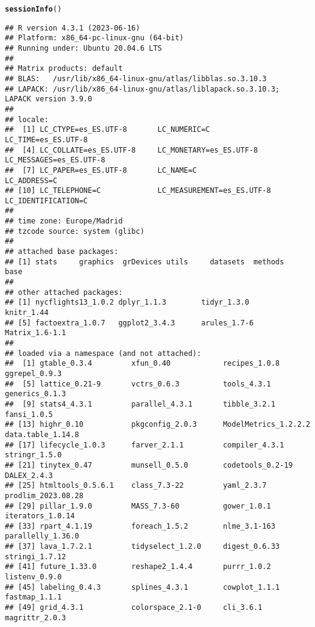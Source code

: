 \documentclass{article}\usepackage[]{graphicx}\usepackage[]{xcolor}
\makeatletter
\newcommand{\hlstd}[1]{\textcolor[rgb]{0.345,0.345,0.345}{#1}}%
\newcommand{\hlkwd}[1]{\textcolor[rgb]{0.737,0.353,0.396}{\textbf{#1}}}%
\newenvironment{kframe}{%
 \def\at@end@of@kframe{}%
 \ifinner\ifhmode%
  \def\at@end@of@kframe{\end{minipage}}%
  \begin{minipage}{\columnwidth}%
 \fi\fi%
 \def\FrameCommand##1{\hskip\@totalleftmargin \hskip-\fboxsep
 \colorbox{shadecolor}{##1}\hskip-\fboxsep
     \hskip-\linewidth \hskip-\@totalleftmargin \hskip\columnwidth}%
 \MakeFramed {\advance\hsize-\width
   \@totalleftmargin\z@ \linewidth\hsize
   \@setminipage}}%
 {\par\unskip\endMakeFramed%
 \at@end@of@kframe}
\newenvironment{knitrout}{}{} %
\makeatother
\begin{document}
\begin{knitrout}
\color{fgcolor}\begin{kframe}
\begin{alltt}
\hlkwd{sessionInfo}\hlstd{()}
\end{alltt}
\begin{verbatim}
## R version 4.3.1 (2023-06-16)
## Platform: x86_64-pc-linux-gnu (64-bit)
## Running under: Ubuntu 20.04.6 LTS
## 
## Matrix products: default
## BLAS:   /usr/lib/x86_64-linux-gnu/atlas/libblas.so.3.10.3 
## LAPACK: /usr/lib/x86_64-linux-gnu/atlas/liblapack.so.3.10.3;  LAPACK version 3.9.0
## 
## locale:
##  [1] LC_CTYPE=es_ES.UTF-8       LC_NUMERIC=C               LC_TIME=es_ES.UTF-8       
##  [4] LC_COLLATE=es_ES.UTF-8     LC_MONETARY=es_ES.UTF-8    LC_MESSAGES=es_ES.UTF-8   
##  [7] LC_PAPER=es_ES.UTF-8       LC_NAME=C                  LC_ADDRESS=C              
## [10] LC_TELEPHONE=C             LC_MEASUREMENT=es_ES.UTF-8 LC_IDENTIFICATION=C       
## 
## time zone: Europe/Madrid
## tzcode source: system (glibc)
## 
## attached base packages:
## [1] stats     graphics  grDevices utils     datasets  methods   base     
## 
## other attached packages:
## [1] nycflights13_1.0.2 dplyr_1.1.3        tidyr_1.3.0        knitr_1.44        
## [5] factoextra_1.0.7   ggplot2_3.4.3      arules_1.7-6       Matrix_1.6-1.1    
## 
## loaded via a namespace (and not attached):
##  [1] gtable_0.3.4         xfun_0.40            recipes_1.0.8        ggrepel_0.9.3       
##  [5] lattice_0.21-9       vctrs_0.6.3          tools_4.3.1          generics_0.1.3      
##  [9] stats4_4.3.1         parallel_4.3.1       tibble_3.2.1         fansi_1.0.5         
## [13] highr_0.10           pkgconfig_2.0.3      ModelMetrics_1.2.2.2 data.table_1.14.8   
## [17] lifecycle_1.0.3      farver_2.1.1         compiler_4.3.1       stringr_1.5.0       
## [21] tinytex_0.47         munsell_0.5.0        codetools_0.2-19     DALEX_2.4.3         
## [25] htmltools_0.5.6.1    class_7.3-22         yaml_2.3.7           prodlim_2023.08.28  
## [29] pillar_1.9.0         MASS_7.3-60          gower_1.0.1          iterators_1.0.14    
## [33] rpart_4.1.19         foreach_1.5.2        nlme_3.1-163         parallelly_1.36.0   
## [37] lava_1.7.2.1         tidyselect_1.2.0     digest_0.6.33        stringi_1.7.12      
## [41] future_1.33.0        reshape2_1.4.4       purrr_1.0.2          listenv_0.9.0       
## [45] labeling_0.4.3       splines_4.3.1        cowplot_1.1.1        fastmap_1.1.1       
## [49] grid_4.3.1           colorspace_2.1-0     cli_3.6.1            magrittr_2.0.3      

\end{verbatim}
\end{kframe}
\end{knitrout}
\end{document}
